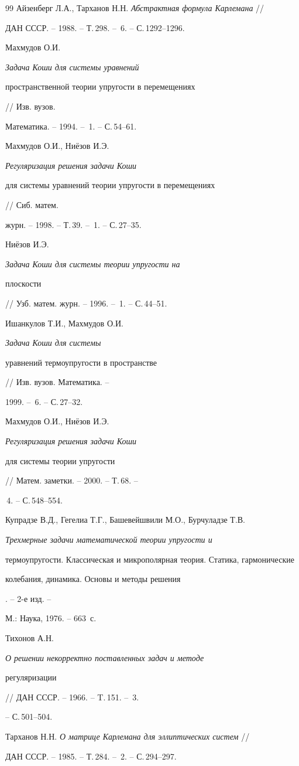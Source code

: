 \begin{thebibliography}{99}
Айзенберг Л.А., Тарханов Н.Н. {\em Абстрактная формула Карлемана} // 


ДАН СССР. -- 1988. -- Т.\,298. -- \No\,6. -- С.\,1292--1296. 




Махмудов О.И. {\em Задача Коши для системы уравнений 


пространственной теории упругости в перемещениях} // Изв. вузов. 


Математика. -- 1994. -- \No\,1. -- С.\,54--61. 




Махмудов О.И., Ни\"езов И.Э. {\em Регуляризация решения задачи Коши 


для системы уравнений теории упругости в перемещениях} // Сиб. матем. 


журн. -- 1998. -- Т.\,39. -- \No\,1. -- С.\,27--35. 




Ни\"езов И.Э. {\em Задача Коши для системы теории упругости на 


плоскости} // Узб. матем. журн. -- 1996. -- \No\,1. -- С.\,44--51. 




Ишанкулов Т.И., Махмудов О.И. {\em Задача Коши для системы 


уравнений термоупругости в пространстве} // Изв. вузов. Математика. -- 


1999. -- \No\,6. -- С.\,27--32. 




Махмудов О.И., Ни\"езов И.Э. {\em Регуляризация решения задачи Коши 


для системы теории упругости} // Матем. заметки. -- 2000. -- Т.\,68. -- 


\No\,4. -- С.\,548--554. 




Купрадзе В.Д., Гегелиа Т.Г., Башевейшвили М.О., Бурчуладзе Т.В. 


{\em Трехмерные задачи математической теории упругости и 


термоупругости. Классическая и микрополярная теория. Статика, гармонические 


колебания, динамика. Основы и методы решения}. -- 2-е изд. -- 


М.: Наука, 1976. -- 663~с. 




Тихонов А.Н. {\em О решении некорректно поставленных задач и методе 


регуляризации} // ДАН СССР. -- 1966. -- T.\,151. -- \No\,3. 


-- С.\,501--504. 




Тарханов Н.Н. {\em О матрице Карлемана для эллиптических систем} // 


ДАН СССР. -- 1985. -- Т.\,284. -- \No\,2. -- С.\,294--297. 


 


\end{thebibliography} 


